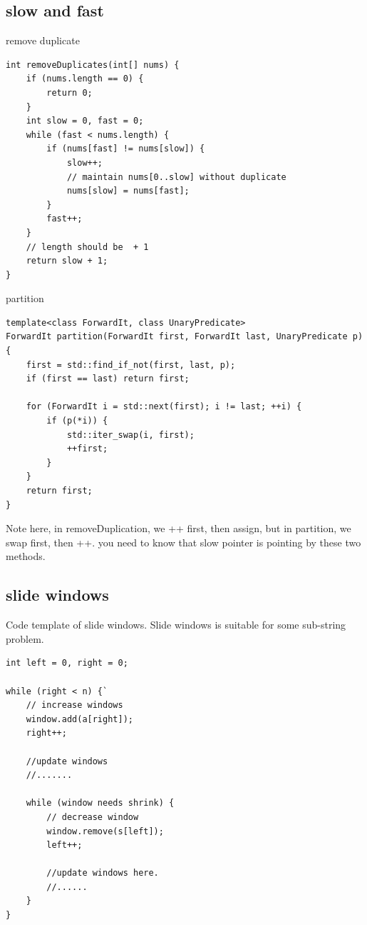 \documentclass[a4paper,11pt,twoside]{book}
\begin{document}
\subsection{slow and fast}

	\par remove duplicate
\begin{lstlisting}[breaklines]
int removeDuplicates(int[] nums) {
	if (nums.length == 0) {
		return 0;
	}
	int slow = 0, fast = 0;
	while (fast < nums.length) {
		if (nums[fast] != nums[slow]) {
			slow++;
			// maintain nums[0..slow] without duplicate
			nums[slow] = nums[fast];
		}
		fast++;
	}
	// length should be  + 1
	return slow + 1;
}
\end{lstlisting}

	\par partition
\begin{lstlisting}[breaklines]
template<class ForwardIt, class UnaryPredicate>
ForwardIt partition(ForwardIt first, ForwardIt last, UnaryPredicate p)
{
	first = std::find_if_not(first, last, p);
	if (first == last) return first;
	
	for (ForwardIt i = std::next(first); i != last; ++i) {
		if (p(*i)) {
			std::iter_swap(i, first);
			++first;
		}
	}
	return first;
}
\end{lstlisting}

	\par Note here, in removeDuplication, we ++ first, then assign, but in partition, we swap first, then ++. you need to know that slow pointer is pointing by these two methods. 

	

\subsection{slide windows}

	\par Code template of slide windows. Slide windows is suitable for some sub-string problem. 

\begin{lstlisting}[breaklines]
int left = 0, right = 0;

while (right < n) {`
	// increase windows
	window.add(a[right]);
	right++;
	
	//update windows
	//.......
	
	while (window needs shrink) {
		// decrease window
		window.remove(s[left]);
		left++;
		
		//update windows here.
		//......
	}
}			
\end{lstlisting}
\end{document}

